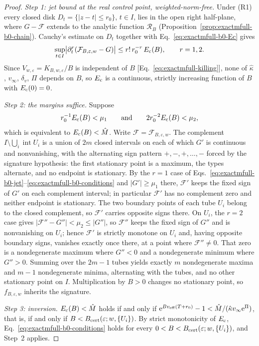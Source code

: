 \begin{proof}
\emph{Step 1: jet bound at the real control point, weighted-norm-free.}
Under (R1) every closed disk \(D_t=\{|z-t|\le r_0\}\), \(t\in I\), lies in
the open right half-plane, where \(G-\mathcal F\) extends to the analytic
function \(\mathcal R_B\)
(Proposition~\ref{prop:exactmfull-b0-chain}).  Cauchy's estimate on
\(D_t\) together with Eq.~\eqref{eq:exactmfull-b0-Ec} gives
\begin{equation}
 \sup_{t\in I}
 \bigl|\partial_t^r(\mathcal F_{B,\varepsilon,w}-G)\bigr|
 \le r!\,r_0^{-r}\,E_{\rm c}(B),
 \qquad r=1,2.
 \label{eq:exactmfull-b0-jet}
\end{equation}
Since \(V_{w,\varepsilon}=K_{B,w,\varepsilon}/B\) is independent of \(B\)
[Eq.~\eqref{eq:exactmfull-killing}], none of \(\hat\kappa\), \(v_\infty\),
\(\delta_v\), \(\Pi\) depends on \(B\), so \(E_{\rm c}\) is a continuous,
strictly increasing function of \(B\) with \(E_{\rm c}(0)=0\).

\emph{Step 2: the margins suffice.}
Suppose
\begin{equation}
 r_0^{-1}E_{\rm c}(B)<\mu_1
 \qquad\text{and}\qquad
 2r_0^{-2}E_{\rm c}(B)<\mu_2,
 \label{eq:exactmfull-b0-conditions}
\end{equation}
which is equivalent to \(E_{\rm c}(B)<\hat M\).  Write
\(\mathcal F=\mathcal F_{B,\varepsilon,w}\).  The complement
\(I\setminus\bigcup_i\operatorname{int}U_i\) is a union of \(2m\) closed
intervals on each of which \(G'\) is continuous and nonvanishing, with the
alternating sign pattern \(+,-,+,\ldots,-\) forced by the signature
hypothesis: the first stationary point is a maximum, the types alternate,
and no endpoint is stationary.  By the \(r=1\) case of
Eqs.~\eqref{eq:exactmfull-b0-jet}--\eqref{eq:exactmfull-b0-conditions} and
\(|G'|\ge\mu_1\) there, \(\mathcal F'\) keeps the fixed sign of \(G'\) on
each complement interval; in particular \(\mathcal F'\) has no complement
zero and neither endpoint is stationary.  The two boundary points of each
tube \(U_i\) belong to the closed complement, so \(\mathcal F'\) carries
opposite signs there.  On \(U_i\), the \(r=2\) case gives
\(|\mathcal F''-G''|<\mu_2\le|G''|\), so \(\mathcal F''\) keeps the fixed
sign of \(G''\) and is nonvanishing on \(U_i\); hence \(\mathcal F'\) is
strictly monotone on \(U_i\) and, having opposite boundary signs, vanishes
exactly once there, at a point where \(\mathcal F''\ne0\).  That zero is a
nondegenerate maximum where \(G''<0\) and a nondegenerate minimum where
\(G''>0\).  Summing over the \(2m-1\) tubes yields exactly \(m\)
nondegenerate maxima and \(m-1\) nondegenerate minima, alternating with the
tubes, and no other stationary point on \(I\).  Multiplication by \(B>0\)
changes no stationary point, so \(f_{B,\varepsilon,w}\) inherits the
signature.

\emph{Step 3: inversion.}
\(E_{\rm c}(B)<\hat M\) holds if and only if
\(\mathrm e^{Bv_{\rm eff}(T+r_0)}-1<\hat M/(\hat\kappa v_\infty\mathrm e^{\Pi})\), that
is, if and only if
\(B<B_{\rm cert}(\varepsilon;w,\{U_i\})\).  By strict
monotonicity of \(E_{\rm c}\),
Eq.~\eqref{eq:exactmfull-b0-conditions} holds for every
\(0<B<B_{\rm cert}(\varepsilon;w,\{U_i\})\), and Step~2 applies.
\end{proof}


